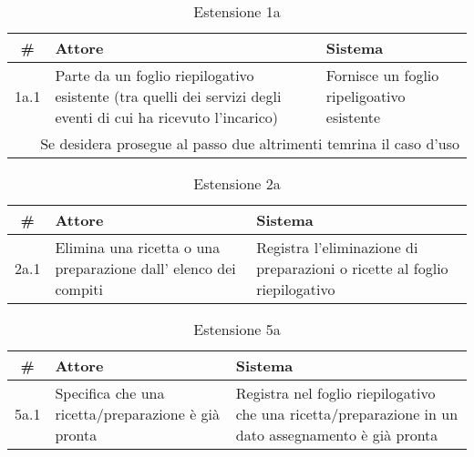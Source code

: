 \begin{table}[H]\centering\caption*{Estensione 1a}
    \small
    \begin{tabular}{|c|p{7cm}|p{6.23cm}|}
        \hline\bfseries \# & \bfseries Attore                                                                                               & \bfseries Sistema                          \\\hline
        1a.1               & Parte da un foglio riepilogativo esistente (tra quelli dei servizi degli eventi di cui ha ricevuto l’incarico) & Fornisce un foglio ripeligoativo esistente \\\hline
        \multicolumn{3}{|r|}{Se desidera prosegue al passo due altrimenti temrina il caso d'uso}                                                                                         \\\hline
    \end{tabular}
\end{table}

\begin{table}[H]\centering\caption*{Estensione 2a}
    \small
    \begin{tabular}{|c|p{7cm}|p{6.23cm}|}
        \hline\bfseries \# & \bfseries Attore                                                & \bfseries Sistema                                                         \\\hline
        2a.1               & Elimina una ricetta o una preparazione dall’ elenco dei compiti & Registra l’eliminazione di preparazioni o ricette al foglio riepilogativo \\\hline
    \end{tabular}
\end{table}

\begin{table}[H]\centering\caption*{Estensione 5a}
    \small
    \begin{tabular}{|c|p{7cm}|p{6.23cm}|}
        \hline\bfseries \# & \bfseries Attore                                    & \bfseries Sistema                                                                                   \\\hline
        5a.1               & Specifica che una ricetta/preparazione è già pronta & Registra nel foglio riepilogativo che una ricetta/preparazione in un dato assegnamento è già pronta \\\hline
    \end{tabular}
\end{table}

